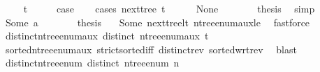 \begin{isabellebody}
\ \ \isamarkupfalse%
\ {\isacharparenleft}{\kern0pt}{}\ t{\isacharparenright}{\kern0pt}\isanewline
\ \ \isamarkupfalse%
\ \isamarkupfalse%
\ {\isacharquery}{\kern0pt}case\isanewline
\ \ \isamarkupfalse%
\ {\isacharparenleft}{\kern0pt}cases\ {\isachardoublequoteopen}next{\isacharunderscore}{\kern0pt}tree\ t{\isachardoublequoteclose}{\isacharparenright}{\kern0pt}\isanewline
\ \ \ \ \isamarkupfalse%
\ None\isanewline
\ \ \ \ \isamarkupfalse%
\ \isamarkupfalse%
\ {\isacharquery}{\kern0pt}thesis\ \isamarkupfalse%
\ simp\isanewline
\ \ \isamarkupfalse%
\isanewline
\ \ \ \ \isamarkupfalse%
\ {\isacharparenleft}{\kern0pt}Some\ a{\isacharparenright}{\kern0pt}\isanewline
\ \ \ \ \isamarkupfalse%
\ \isamarkupfalse%
\ {\isacharquery}{\kern0pt}thesis\ \isamarkupfalse%
\ {}\ Some\ next{\isacharunderscore}{\kern0pt}tree{\isacharunderscore}{\kern0pt}lt{\isacharprime}{\kern0pt}\ n{\isacharunderscore}{\kern0pt}tree{\isacharunderscore}{\kern0pt}enum{\isacharunderscore}{\kern0pt}aux{\isacharunderscore}{\kern0pt}le\ \isamarkupfalse%
\ fastforce\isanewline
\ \ \isamarkupfalse%
\isanewline
{}\isamarkupfalse%
%
\endisatagproof
{\isafoldproof}%
%
\isadelimproof
\isanewline
%
\endisadelimproof
\isanewline
{}\isamarkupfalse%
\ distinct{\isacharunderscore}{\kern0pt}n{\isacharunderscore}{\kern0pt}tree{\isacharunderscore}{\kern0pt}enum{\isacharunderscore}{\kern0pt}aux{\isacharcolon}{\kern0pt}\ {\isachardoublequoteopen}distinct\ {\isacharparenleft}{\kern0pt}n{\isacharunderscore}{\kern0pt}tree{\isacharunderscore}{\kern0pt}enum{\isacharunderscore}{\kern0pt}aux\ t{\isacharparenright}{\kern0pt}{\isachardoublequoteclose}\isanewline
%
\isadelimproof
\ \ %
\endisadelimproof
%
\isatagproof
{}\isamarkupfalse%
\ sorted{\isacharunderscore}{\kern0pt}n{\isacharunderscore}{\kern0pt}tree{\isacharunderscore}{\kern0pt}enum{\isacharunderscore}{\kern0pt}aux\ strict{\isacharunderscore}{\kern0pt}sorted{\isacharunderscore}{\kern0pt}iff\ distinct{\isacharunderscore}{\kern0pt}rev\ sorted{\isacharunderscore}{\kern0pt}wrt{\isacharunderscore}{\kern0pt}rev\ \isamarkupfalse%
\ blast%
\endisatagproof
{\isafoldproof}%
%
\isadelimproof
\isanewline
%
\endisadelimproof
\isanewline
{}\isamarkupfalse%
\ distinct{\isacharunderscore}{\kern0pt}n{\isacharunderscore}{\kern0pt}tree{\isacharunderscore}{\kern0pt}enum{\isacharcolon}{\kern0pt}\ {\isachardoublequoteopen}distinct\ {\isacharparenleft}{\kern0pt}n{\isacharunderscore}{\kern0pt}tree{\isacharunderscore}{\kern0pt}enum\ n{\isacharparenright}{\kern0pt}{\isachardoublequoteclose}\isanewline

\end{isabellebody}
